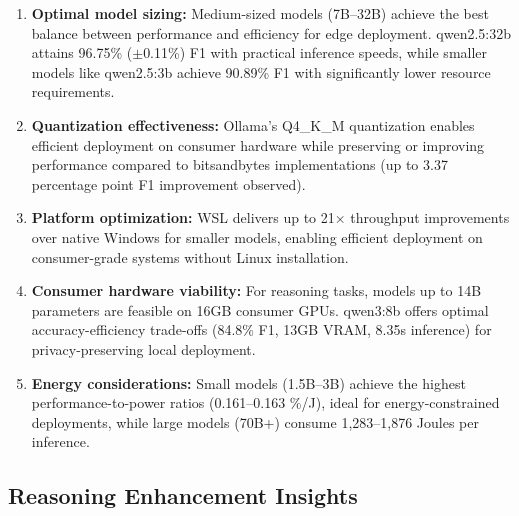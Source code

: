 \begin{enumerate}[leftmargin=*]
    \item \textbf{Optimal model sizing:} Medium-sized models (7B--32B) achieve the best balance between performance and efficiency for edge deployment. qwen2.5:32b attains 96.75\% ($\pm$0.11\%) F1 with practical inference speeds, while smaller models like qwen2.5:3b achieve 90.89\% F1 with significantly lower resource requirements.
    
    \item \textbf{Quantization effectiveness:} Ollama's Q4\_K\_M quantization enables efficient deployment on consumer hardware while preserving or improving performance compared to bitsandbytes implementations (up to 3.37 percentage point F1 improvement observed).
    
    \item \textbf{Platform optimization:} WSL delivers up to 21$\times$ throughput improvements over native Windows for smaller models, enabling efficient deployment on consumer-grade systems without Linux installation.
    
    \item \textbf{Consumer hardware viability:} For reasoning tasks, models up to 14B parameters are feasible on 16GB consumer GPUs. qwen3:8b offers optimal accuracy-efficiency trade-offs (84.8\% F1, 13GB VRAM, 8.35s inference) for privacy-preserving local deployment.
    
    \item \textbf{Energy considerations:} Small models (1.5B--3B) achieve the highest performance-to-power ratios (0.161--0.163 \%/J), ideal for energy-constrained deployments, while large models (70B+) consume 1,283--1,876 Joules per inference.
\end{enumerate}

\subsection{Reasoning Enhancement Insights}

